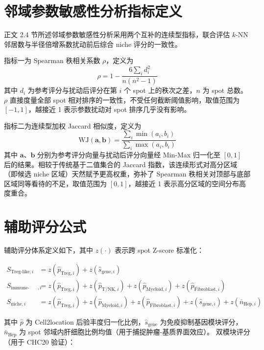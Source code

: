 \documentclass[12pt, a4paper]{ctexart}
\begin{document}
\section{邻域参数敏感性分析指标定义}
\label{app:sensitivity}

正文 2.4 节所述邻域参数敏感性分析采用两个互补的连续型指标，联合评估 $k$-NN 邻居数与半径倍增系数扰动前后综合 niche 评分的一致性。

指标一为 Spearman 秩相关系数 $\rho$，定义为
\begin{equation}
\rho = 1 - \frac{6 \sum_i d_i^2}{n(n^2-1)}
\label{eq:spearman}
\end{equation}
其中 $d_i$ 为参考评分与扰动后评分在第 $i$ 个 spot 上的秩次之差，$n$ 为 spot 总数。$\rho$ 直接度量全部 spot 相对排序的一致性，不受任何截断阈值影响，取值范围为 $[-1, 1]$，越接近 1 表示参数扰动对 spot 排序几乎没有影响。

指标二为连续型加权 Jaccard 相似度，定义为
\begin{equation}
\text{WJ}(\mathbf{a}, \mathbf{b}) = \frac{\sum_i \min(a_i, b_i)}{\sum_i \max(a_i, b_i)}
\label{eq:weighted_jaccard}
\end{equation}
其中 $\mathbf{a}$、$\mathbf{b}$ 分别为参考评分向量与扰动后评分向量经 Min-Max 归一化至 $[0,1]$ 后的结果。相较于传统基于二值集合的 Jaccard 指数，该连续形式对高分区域（即候选 niche 区域）天然赋予更高权重，弥补了 Spearman 秩相关对顶部与底部区域同等看待的不足，取值范围为 $[0, 1]$，越接近 1 表示高分区域的空间分布高度重合。

\section{辅助评分公式}
\label{app:scores}

辅助评分体系定义如下，其中 $z(\cdot)$ 表示跨 spot Z-score 标准化：

\begin{align}
S_{\text{Treg-like},i} &= z(\hat{p}_{\text{Treg},i}) + z(\hat{s}_{\text{gene},i}) \\
S_{\text{immune-stroma},i} &= z(\hat{p}_{\text{Treg},i}) + z(\hat{p}_{\text{T/NK},i}) + z(\hat{p}_{\text{Myeloid},i}) + z(\hat{p}_{\text{Fibroblast},i}) \\
S_{\text{niche},i} &= z(\hat{p}_{\text{Treg},i}) + z(\hat{p}_{\text{Myeloid},i}) + z(\hat{p}_{\text{Fibroblast},i}) + z(\hat{s}_{\text{gene},i}) + z(\bar{n}_{\text{Hep},i})
\end{align}

其中 $\hat{p}$ 为 Cell2location 后验丰度归一化比例，$\hat{s}_{\text{gene}}$ 为免疫抑制基因模块评分，
$\bar{n}_{\text{Hep}}$ 为 spot 邻域内肝细胞比例均值（用于捕捉肿瘤-基质界面效应）。
双模块评分（用于 CHC20 验证）：
\end{document}
